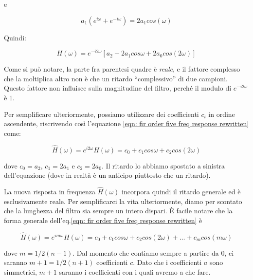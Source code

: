 e

\begin{equation}
	a_1 ( e^{i \omega} + e^{-i \omega} ) = 2 a_1 cos(\omega)
\end{equation}

Quindi:

\begin{equation}\label{eqn: fir order five freq response rewritten}
	H(\omega) = e^{-i2\omega} \left [ a_2 + 2 a_1 cos \omega + 2 a_0 cos (2 \omega) \right ]
\end{equation}

Come si pu\`o notare, la parte fra parentesi quadre \`e \emph{reale}, e il
fattore complesso che la moltiplica altro non \`e che un ritardo
``complessivo'' di due campioni. Questo fattore non influisce sulla
magnitudine del filtro, perch\'e il modulo di $e^{-i 2 \omega}$ \`e $1$.

Per semplificare ulteriormente, possiamo utilizzare dei coefficienti $c_i$ in
ordine ascendente, riscrivendo cos\`i l'equazione \ref{eqn: fir order five freq response rewritten} come:

\begin{equation}\label{eqn: fir order five freq response rewritten 2}
  \hat{H}(\omega) = e^{i2\omega} H(\omega) = c_0 + c_1 cos \omega + c_2 cos (2 \omega)
\end{equation}

dove $c_0 = a_2$, $c_1 = 2 a_1$ e $c_2 = 2 a_0$. Il ritardo lo abbiamo
spostato a sinistra dell'equazione (dove in realt\`a \`e un anticipo piuttosto
che un ritardo).

La nuova risposta in frequenza $\hat{H}(\omega)$ incorpora quindi il ritardo
generale ed \`e esclusivamente reale.
Per semplificarci la vita ulteriormente, diamo per scontato che la lunghezza
del filtro sia sempre un intero dispari.
\`E facile notare che la forma generale dell'eq.\ref{eqn: fir order five freq response rewritten}
\`e

\begin{equation}\label{eqn: fir rewritten general form}
  \hat{H}(\omega) = e^{im\omega} H(\omega) = c_0 + c_1 cos \omega + c_2 cos (2 \omega) + \dots + c_m cos (m \omega)
\end{equation}

dove $m = 1/2 (n - 1)$.
Dal momento che contiamo sempre a partire da $0$, ci saranno $m + 1 = 1/2 (n + 1)$ coefficienti $c$.
Dato che i coefficienti $a$ sono simmetrici, $m + 1$ saranno i coefficienti
con i quali avremo a che fare.

